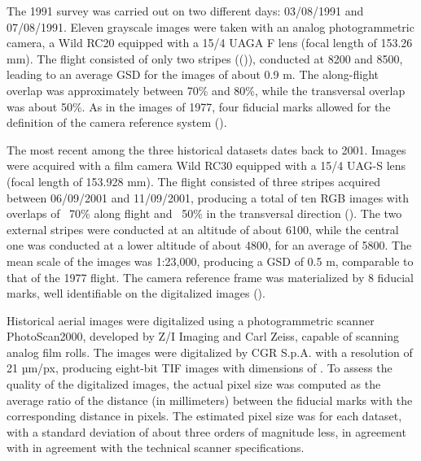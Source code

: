 The 1991 survey was carried out on two different days: 03/08/1991 and 07/08/1991.
Eleven grayscale images were taken with an analog photogrammetric camera, a Wild RC20
equipped with a 15/4 UAGA F lens (focal length of 153.26 mm). The flight consisted of only
two stripes (()), conducted at \SI{8200}{\masl} and \SI{8500}{\masl}, leading to an average
GSD for the images of about 0.9 m. The along-flight overlap was approximately between
70\% and 80\%, while the transversal overlap was about 50\%. As in the images of 1977, four
fiducial marks allowed for the definition of the camera reference system ().

The most recent among the three historical datasets dates back to 2001. Images were
acquired with a film camera Wild RC30 equipped with a 15/4 UAG-S lens (focal length
of 153.928 mm). The flight consisted of three stripes acquired between 06/09/2001 and
11/09/2001, producing a total of ten RGB images with overlaps of ~70\% along flight and
~50\% in the transversal direction (). The two external stripes were conducted at an
altitude of about \SI{6100}{\masl}, while the central one was conducted at a lower altitude of
about \SI{4800}{\masl}, for an average of \SI{5800}{\masl}. The mean scale of the images was 1:23,000, producing a GSD of 0.5 m, comparable to that of the 1977 flight. 
The camera reference frame was materialized by 8 fiducial marks, well identifiable on the digitalized images ().

Historical aerial images were digitalized using a photogrammetric scanner PhotoScan2000, developed by Z/I Imaging and Carl Zeiss, capable of scanning analog film rolls. 
The images were digitalized by CGR S.p.A. with a resolution of 21 µm/px, producing eight-bit TIF 
images with dimensions of . 
To assess the quality of the digitalized images, the actual pixel size was computed as the average ratio of the distance (in millimeters) between the fiducial marks with the corresponding distance in pixels. 
The estimated pixel size was  for each dataset, with a standard deviation of about three orders of magnitude less, in agreement with in agreement with the technical scanner specifications.

